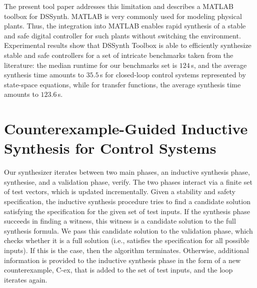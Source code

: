 \documentclass[10pt,conference]{IEEEtran}
\newcommand\tool{{DSSynth Toolbox}\xspace}
\begin{document}
The present tool paper addresses this limitation and describes a MATLAB
toolbox for DSSynth.  MATLAB is very commonly used for modeling physical
plants.  Thus, the integration into MATLAB enables rapid synthesis of a
stable and safe digital controller for such plants without switching the
environment. Experimental results show that \tool is able to efficiently 
synthesize stable and safe controllers for a set of intricate benchmarks taken 
from the literature:  the median runtime for our benchmarks set is $124$\,s, 
and the average synthesis time amounts to $35.5$\,s for closed-loop control 
systems represented by state-space equations, while for transfer functions, the average synthesis
time amounts to $123.6$\,s.

\section{Counterexample-Guided Inductive Synthesis for Control Systems}
\label{sec:CEGIS}



Our synthesizer iterates between two main phases, an inductive synthesis
phase, {\sc synthesise}, and a validation phase, {\sc verify}.  The two
phases interact via a finite set of test vectors, which is updated
incrementally.  Given a stability and safety specification, the inductive
synthesis procedure tries to find a candidate solution satisfying the
specification for the given set of test inputs.
%
If the synthesis phase succeeds in finding a witness, this witness is a
candidate solution to the full synthesis formula.  We pass this candidate
solution to the validation phase, which checks whether it is a full solution
(i.e., satisfies the specification for all possible inputs).  If this is the
case, then the algorithm terminates.  Otherwise, additional information is
provided to the inductive synthesis phase in the form of a new
counterexample, C-ex, that is added to the set of test inputs, and the loop
iterates again.
\end{document}
